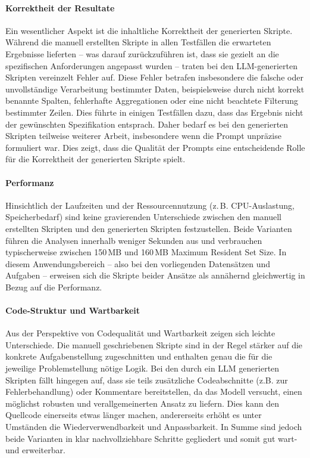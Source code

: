 \documentclass[11pt,a4paper]{article}
\begin{document}
\paragraph{Korrektheit der Resultate}
Ein wesentlicher Aspekt ist die inhaltliche Korrektheit der generierten Skripte. Während die manuell erstellten Skripte in allen Testfällen die erwarteten Ergebnisse lieferten – was darauf zurückzuführen ist, dass sie gezielt an die spezifischen Anforderungen angepasst wurden – traten bei den LLM-generierten Skripten vereinzelt Fehler auf. Diese Fehler betrafen insbesondere die falsche oder unvollständige Verarbeitung bestimmter Daten, beispielsweise durch nicht korrekt benannte Spalten, fehlerhafte Aggregationen oder eine nicht beachtete Filterung bestimmter Zeilen. Dies führte in einigen Testfällen dazu, dass das Ergebnis nicht der gewünschten Spezifikation entsprach. Daher bedarf es bei den generierten Skripten teilweise weiterer Arbeit, insbesondere wenn die Prompt unpräzise formuliert war. Dies zeigt, dass die Qualität der Prompts eine entscheidende Rolle für die Korrektheit der generierten Skripte spielt.

\paragraph{Performanz}
Hinsichtlich der Laufzeiten und der Ressourcennutzung (z.\,B. CPU-Auslastung, Speicherbedarf) sind keine gravierenden Unterschiede zwischen den manuell erstellten Skripten und den generierten Skripten festzustellen. Beide Varianten führen die Analysen innerhalb weniger Sekunden aus und verbrauchen typischerweise zwischen 150\,MB und 160\,MB Maximum Resident Set Size. In diesem Anwendungsbereich -- also bei den vorliegenden Datensätzen und Aufgaben -- erweisen sich die Skripte beider Ansätze als annähernd gleichwertig in Bezug auf die Performanz.

\paragraph{Code-Struktur und Wartbarkeit}
Aus der Perspektive von Codequalität und Wartbarkeit zeigen sich leichte Unterschiede. Die manuell geschriebenen Skripte sind in der Regel stärker auf die konkrete Aufgabenstellung zugeschnitten und enthalten genau die für die jeweilige Problemstellung nötige Logik. Bei den durch ein LLM generierten Skripten fällt hingegen auf, dass sie teils zusätzliche Codeabschnitte (z.B. zur Fehlerbehandlung) oder Kommentare bereitstellen, da das Modell versucht, einen möglichst robusten und verallgemeinerten Ansatz zu liefern. Dies kann den Quellcode einerseits etwas länger machen, andererseits erhöht es unter Umständen die Wiederverwendbarkeit und Anpassbarkeit. In Summe sind jedoch beide Varianten in klar nachvollziehbare Schritte gegliedert und somit gut wart- und erweiterbar.
\end{document}
